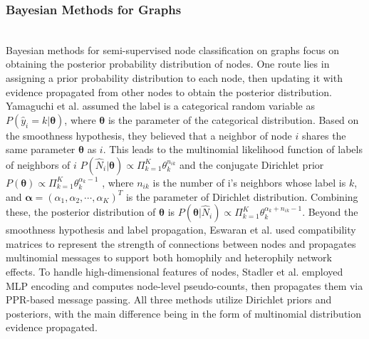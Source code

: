 \subsubsection{Bayesian Methods for Graphs}\hfill\\
Bayesian methods for semi-supervised node classification on graphs focus on obtaining the posterior probability distribution of nodes. One route lies in assigning a prior probability distribution to each node, then updating it with evidence propagated from other nodes to obtain the posterior distribution. Yamaguchi et al. \cite{yamaguchi2015socnl} assumed the label is a categorical random variable as $P(\hat{y}_i=k|\boldsymbol{\theta})$, where $\boldsymbol{\theta}$
 is the parameter of the categorical distribution. 
 Based on the smoothness hypothesis, they believed that a neighbor of node $i$ shares the same parameter $\boldsymbol{\theta}$ as $i$. 
 This leads to the multinomial likelihood function of labels of neighbors of $i$ $P(\hat{N}_i|\boldsymbol{\theta})\propto\Pi_{k=1}^K\theta_k^{n_{ik}}$ and the conjugate Dirichlet prior $P(\boldsymbol{\theta})\propto\Pi_{k=1}^K\theta_k^{\alpha_k-1}$
 , where $n_{ik}$ is the number of i’s neighbors whose label is $k$, and $\boldsymbol{\alpha}=(\alpha_1,\alpha_2,\cdots,\alpha_K)^T$ is the parameter of Dirichlet distribution. 
 Combining these, the posterior distribution of $\boldsymbol{\theta}$ is $P(\boldsymbol{\theta}|\hat{N}_i)\propto\Pi_{k=1}^K\theta_k^{\alpha_k+n_{ik}-1}$. Beyond the smoothness hypothesis and label propagation, Eswaran et al. \cite{eswaran2017power} used compatibility matrices to represent the strength of connections between nodes and propagates multinomial messages to support both homophily and heterophily network effects. 
 To handle high-dimensional features of nodes, Stadler et al. \cite{stadler2021graph} employed MLP encoding and computes node-level pseudo-counts, then propagates them via PPR-based message passing. All three methods utilize Dirichlet priors and posteriors, with the main difference being in the form of multinomial distribution evidence propagated.

